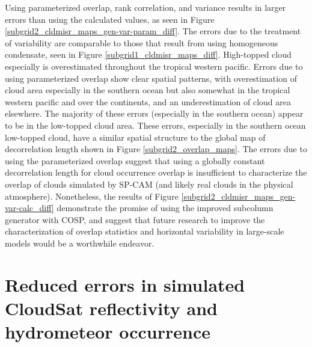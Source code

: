 Using parameterized overlap, rank correlation, and variance results in larger errors than using the calculated values, as seen in Figure \ref{subgrid2_cldmisr_maps_gen-var-param_diff}. The errors due to the treatment of variability are comparable to those that result from using homogeneous condensate, seen in Figure \ref{subgrid1_cldmisr_maps_diff}. High-topped cloud especially is overestimated throughout the tropical western pacific. Errors due to using parameterized overlap show clear spatial patterns, with overestimation of cloud area especially in the southern ocean but also somewhat in the tropical western pacific and over the continents, and an underestimation of cloud area elsewhere. The majority of these errors (especially in the southern ocean) appear to be in the low-topped cloud area. These errors, especially in the southern ocean low-topped cloud, have a similar spatial structure to the global map of decorrelation length shown in Figure \ref{subgrid2_overlap_maps}. The errors due to using the parameterized overlap suggest that using a globally constant decorrelation length for cloud occurrence overlap is insufficient to characterize the overlap of clouds simulated by SP-CAM (and likely real clouds in the physical atmosphere). Nonetheless, the results of Figure \ref{subgrid2_cldmisr_maps_gen-var-calc_diff} demonstrate the promise of using the improved subcolumn generator with COSP, and suggest that future research to improve the characterization of overlap statistics and horizontal variability in large-scale models would be a worthwhile endeavor.

\section{Reduced errors in simulated CloudSat reflectivity and hydrometeor occurrence}
\label{subgrid2_active_section}

